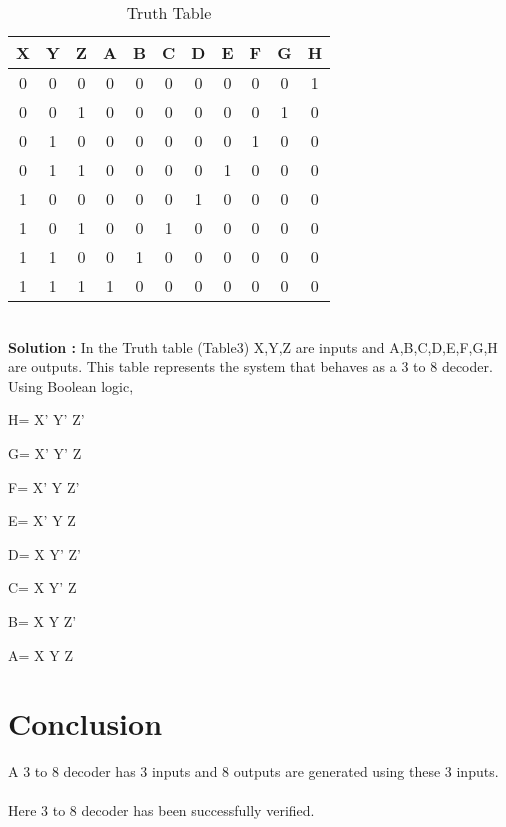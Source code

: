 \documentclass[journal,12pt,twocolumn]{IEEEtran}
\begin{document}
    \begin{table}[h]
    \centering
    \begin{tabular}{| c | c | c || c | c | c | c | c | c | c | c |}
    \hline
    \textbf{X} & \textbf{Y} & \textbf{Z} & \textbf{A} & \textbf{B} & \textbf{C} & \textbf{D} & \textbf{E} & \textbf{F} & \textbf{G} & \textbf{H} \\
    \hline
    0 & 0 & 0 & 0 & 0 & 0 & 0 & 0 & 0 & 0 & 1  \\
    \hline
    0 & 0 & 1 & 0 & 0 & 0 & 0 & 0 & 0 & 1 & 0  \\
    \hline
    0 & 1 & 0 & 0 & 0 & 0 & 0 & 0 & 1 & 0 & 0  \\
    \hline
    0 & 1 & 1 & 0 & 0 & 0 & 0 & 1 & 0 & 0 & 0  \\
    \hline
    1 & 0 & 0 & 0 & 0 & 0 & 1 & 0 & 0 & 0 & 0  \\
    \hline
    1 & 0 & 1 & 0 & 0 & 1 & 0 & 0 & 0 & 0 & 0  \\
    \hline
    1 & 1 & 0 & 0 & 1 & 0 & 0 & 0 & 0 & 0 & 0  \\
    \hline
    1 & 1 & 1 & 1 & 0 & 0 & 0 & 0 & 0 & 0 & 0  \\
    \hline
    \end{tabular}
    \caption{Truth Table}
    \label{tab:my_label}
 \end{table}
 \\
\textbf{Solution :}  In the Truth table (Table3) X,Y,Z are inputs and A,B,C,D,E,F,G,H are outputs. This table represents the system that behaves as a 3 to 8 decoder. Using Boolean logic, \\
 \begin{center}
     H= X' Y' Z'\\
 \end{center}
  \begin{center}
      G= X' Y' Z\\
 \end{center}
  \begin{center}
      F= X' Y Z'\\
 \end{center}
  \begin{center}
      E= X' Y Z\\
 \end{center}
  \begin{center}
     D= X Y' Z'\\
 \end{center}
  \begin{center}
     C= X Y' Z\\
 \end{center}
  \begin{center}
     B= X Y Z'\\
 \end{center}
  \begin{center}
     A= X Y Z\\
 \end{center} 
 \section{Conclusion}
 A 3 to 8 decoder has 3 inputs and 8 outputs are generated using these 3 inputs.\\
 \\
  Here 3 to 8 decoder has been successfully verified.\\
\end{document}
